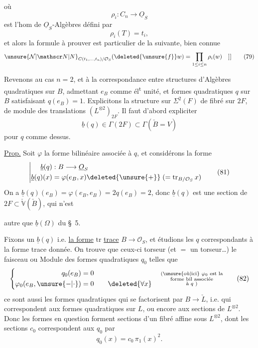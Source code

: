 où
\[
\rho_i:C_n\longrightarrow\underline O_S \tag*{(77)}
\]
est l'hom de $\underline O_S$-Algèbres défini par
\[
\rho_i(T)=t_i, \tag*{(78)}
\]
et alors la formule à prouver est  particulier
de la suivante, bien connue
\[
 \unsure{\mathcal N|\mathscr N|N}_{C(t_1,\ldots,t_n)/\mathcal O_S}(\deleted{\unsure{f}}w)=\prod_{1\leq i\leq n}\rho_i(w)\quad ]] \tag*{(79)}
\]

Revenons  au cas $n=2$, et à la correspondance
entre structures d'Algèbres quadratiques
sur $B$, admettant $e_B$ comme él\textsuperscript{t} unité, et
 formes quadratiques $q$ sur $B$ satisfaisant
$q(e_B)=1$. Explicitons la structure sur
$\Sigma^2(F)$ de fibré  sur $2F$, de 
module des translations $(L^{\otimes2})_{2F}$. Il
faut d'abord expliciter
\[
\underline b(q)\in\Gamma(2F)\subset\Gamma(\check B=V) \tag*{(80)}
\]
pour $q$ comme dessus. 

\uline{Prop.} Soit $\varphi$ la forme bilinéaire associée à
$q$, et considérons la forme
\[
\left|\begin{aligned}
\underline b(q)&:B\longrightarrow\underline O_S\\
\underline b(q)(x)&=\varphi(e_B,x)\deleted{\unsure{+}}\;(=\mathrm{tr}_{B/\mathcal O_S}\,x)
\end{aligned}\right. \tag*{(81)}
\]
On a $\underline b(q)(e_B)=\varphi(e_B,e_B)=2q(e_B)=2$, donc
$\underline b(q)$ est une section de $2F\subset\check{\mathbb V}(\check B)$, qui n'est

autre que $\underline b(\Omega)$ du \S~5.

Fixons un $\underline b(q)$  i.e.  \uline{la forme} $\mathrm{tr}$
\uline{trace} $B\longrightarrow\mathcal O_S$, et étudions les $q$ correspondants
à la forme trace donnée. On trouve
que ceux-ci   torseur (et $=$ un
torseur\ldots)  le faisceau ou Module des
formes quadratiques $q_0$ telles que
\[
\left\{\begin{aligned}q_0(e_B)&=0\\
\varphi_0(e_B,\unsure{-|\cdot})&=0\qquad\deleted{\forall x}
\end{aligned}\right.\quad
\substack{\text{(\unsure{où|ici} $\varphi_0$ est la}\\\text{forme bil associée}\\\text{à $q$ )}} \tag*{(82)}
\]
ce sont aussi les formes quadratiques
qui se factorisent par $B\longrightarrow\check L$, i.e.
qui correspondent aux formes quadratiques
sur $L$, ou encore aux  sections de
$L^{\otimes2}$. Donc les formes en question
forment  sections d'un fibré affine sous
$L^{\otimes2}$, dont les sections $c_0$ correspondent aux $q_0$ par
\[
q_0(x)=c_0\,\pi_1(x)^2. \tag*{(83)}
\]

